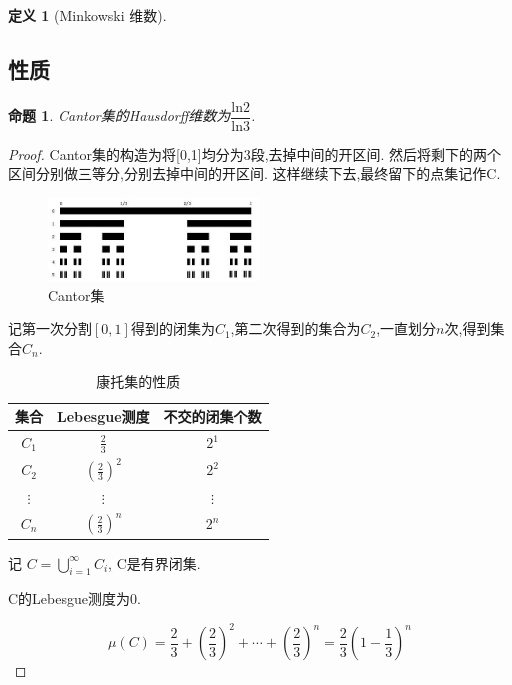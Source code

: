 \documentclass[hyperref,a4paper,UTF8]{ctexart}
\newtheorem{definition}{定义}[section]
\newtheorem{proposition}{{命题}}
\begin{document}
\begin{definition}[Minkowski 维数]

\end{definition}


\subsection{性质}
\begin{proposition}

  Cantor集的Hausdorff维数为$\dfrac{\mathrm{ln}2}{\mathrm{ln}3}$. 
\end{proposition}

\begin{proof}
Cantor集的构造为将[0,1]均分为3段,去掉中间的开区间. 然后将剩下的两个区间分别做三等分,分别去掉中间的开区间. 这样继续下去,最终留下的点集记作C. 

\begin{figure}[htbp]
  \centering
  \includegraphics[width=0.5\textwidth]{image/cantor.jpg}
  \caption{Cantor集}
\end{figure}

记第一次分割$[0,1]$得到的闭集为$C_1$,第二次得到的集合为$C_2$,一直划分$n$次,得到集合$C_n$. 

\begin{table}[htbp]
  \centering
  \caption{康托集的性质}
  \begin{tabular}{ccc}
  \toprule
  集合 & Lebesgue测度 & 不交的闭集个数 \\
  \midrule
  $C_1$ & $\frac{2}{3}$ & $2^1$ \\
  $C_2$ & $\left(\frac{2}{3}\right)^2$ & $2^2$ \\
  $\vdots$ & $\vdots$ & $\vdots$ \\
  $C_n$ & $\left(\frac{2}{3}\right)^n$ & $2^n$ \\
  \bottomrule
  \end{tabular}
\end{table}

记 $C = \bigcup\limits_{i=1}^{\infty} C_i$, C是有界闭集. 

C的Lebesgue测度为0. 

\[
\mu(C) = \frac{2}{3}+\left(\frac{2}{3}\right)^2+\cdots+\left(\frac{2}{3}\right)^n=\frac{2}{3}\left(1-\frac{1}{3}\right)^n
\]


\end{proof}
\end{document}
